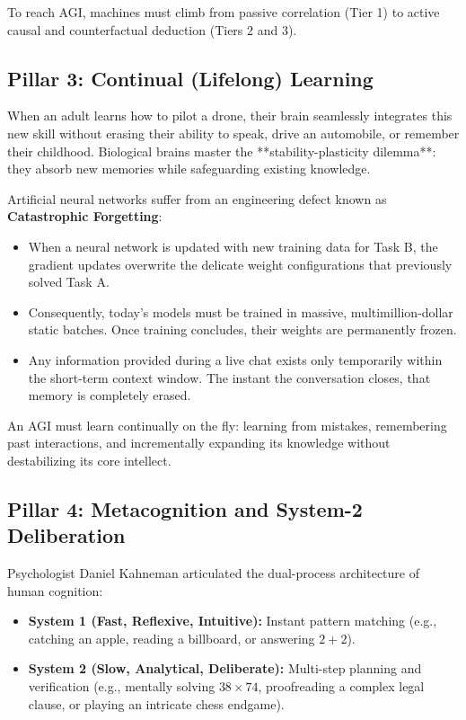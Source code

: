 \documentclass[11pt,journal,onecolumn]{IEEEtran}
\begin{document}
To reach AGI, machines must climb from passive correlation (Tier 1) to active causal and counterfactual deduction (Tiers 2 and 3).

\subsection{Pillar 3: Continual (Lifelong) Learning}
When an adult learns how to pilot a drone, their brain seamlessly integrates this new skill without erasing their ability to speak, drive an automobile, or remember their childhood. Biological brains master the **stability-plasticity dilemma**: they absorb new memories while safeguarding existing knowledge.

Artificial neural networks suffer from an engineering defect known as \textbf{Catastrophic Forgetting}:
\begin{itemize}
    \item When a neural network is updated with new training data for Task B, the gradient updates overwrite the delicate weight configurations that previously solved Task A.
    \item Consequently, today's models must be trained in massive, multimillion-dollar static batches. Once training concludes, their weights are permanently frozen.
    \item Any information provided during a live chat exists only temporarily within the short-term context window. The instant the conversation closes, that memory is completely erased.
\end{itemize}

An AGI must learn continually on the fly: learning from mistakes, remembering past interactions, and incrementally expanding its knowledge without destabilizing its core intellect.

\subsection{Pillar 4: Metacognition and System-2 Deliberation}
Psychologist Daniel Kahneman articulated the dual-process architecture of human cognition:
\begin{itemize}
    \item \textbf{System 1 (Fast, Reflexive, Intuitive):} Instant pattern matching (e.g., catching an apple, reading a billboard, or answering $2 + 2$).
    \item \textbf{System 2 (Slow, Analytical, Deliberate):} Multi-step planning and verification (e.g., mentally solving $38 \times 74$, proofreading a complex legal clause, or playing an intricate chess endgame).
\end{itemize}
\end{document}
